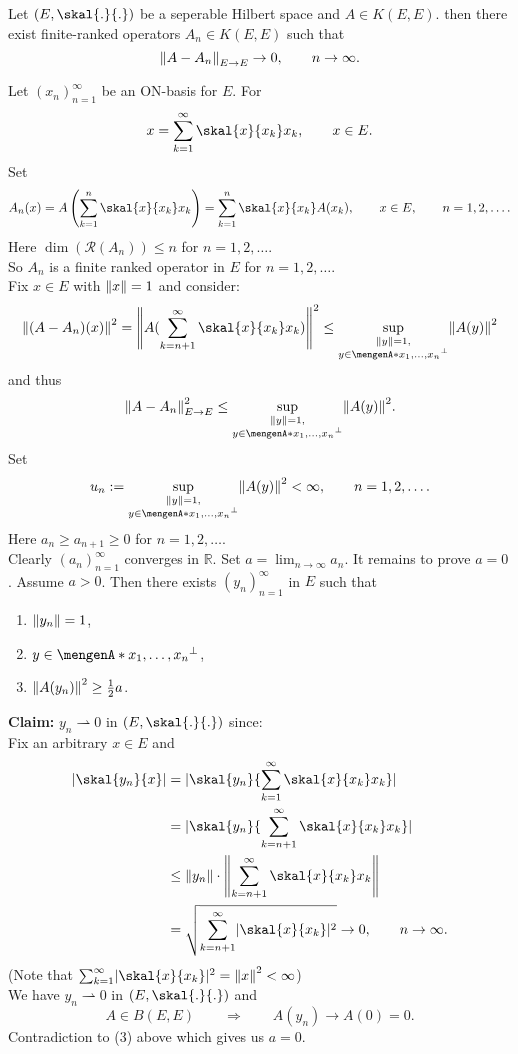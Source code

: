 \begin{proposition}
	Let $(E, \skal{.}{.})$ be a seperable Hilbert space and $A \in K(E,E)$. then there exist finite-ranked operators $A_n \in K(E,E)$ such that
	\[
		\norm{A-A_n}_{E \to E} \to 0, \qquad n \to \infty.
	\]
\end{proposition}
\begin{beweis}
	Let $(x_n)_{n=1}^{\infty}$ be an ON-basis for $E$. For 
	\[
		x = \sum_{k=1}^{\infty} \skal{x}{x_k}x_k, \qquad x \in E.
	\]
	Set 
	\[
		A_n(x) = A \left( \sum_{k=1}^{n}\skal{x}{x_k}x_k \right) = \sum_{k=1}^{n} \skal{x}{x_k}A(x_k), \qquad x \in E, \qquad n=1,2,\dots.
	\]
	Here $\dim( \mathcal{R}(A_n)) \leq n$ for $n =1,2,\dots$. \\
	So $A_n$ is a finite ranked operator in $E$ for $n=1,2,\dots$. \\
	Fix $x \in E$ with $\norm{x}=1$ and consider:
	\[
		\norm{(A-A_n)(x)}^2 = \norm{A(\sum_{k=n+1}^{\infty} \skal{x}{x_k}x_k)}^2 \leq \sup\limits_{\substack{\norm{y}=1, \\ y \in \set{x_1,\dots,x_n}^{\perp}}}
		\norm{A(y)}^2
	\]
	and thus
	\[
		\norm{A-A_n}_{E \to E}^2 \leq \sup\limits_{\substack{\norm{y}=1, \\ y \in \set{x_1,\dots,x_n}^{\perp}}} \norm{A(y)}^2.
	\]
	Set 
	\[
		u_n := \sup\limits_{\substack{\norm{y}=1, \\ y \in \set{x_1,\dots,x_n}^{\perp}}} \norm{A(y)}^2 < \infty, \qquad n =1,2,\dots.
	\]
	Here $a_n \geq a_{n+1} \geq 0$ for $n=1,2,\dots$. \\
	Clearly $(a_n)_{n=1}^{\infty}$ converges in $\mathbb{R}$. Set $a = \lim_{n \to \infty}a_n$. It remains to prove $a =0$.
	Assume $a>0$. Then there exists $(y_n)_{n=1}^{\infty}$ in $E$ such that
	\begin{enumerate}
		\item $\norm{y_n}=1$,
		\item $y \in \set{x_1,\dots,x_n}^{\perp}$,
		\item $\norm{A(y_n)}^2 \geq \frac{1}{2} a$.
	\end{enumerate}
	\textbf{Claim:} \text{    } $y_n \rightharpoonup 0$ in $(E,\skal{.}{.})$ since: \\
	Fix an arbitrary $x \in E$ and
	\begin{align*}
		\abs{\skal{y_n}{x}} &= \abs{\skal{y_n}{\sum_{k=1}^{\infty} \skal{x}{x_k}x_k}} \\
		&= \abs{\skal{y_n}{\sum_{k=n+1}^{\infty}\skal{x}{x_k}x_k}} \\
		&\leq \norm{y_n} \cdot \norm{\sum_{k=n+1}^{\infty}\skal{x}{x_k}x_k} \\
		&= \sqrt{\sum_{k=n+1}^{\infty}\abs{\skal{x}{x_k}}^2} \to 0, \qquad n \to \infty.
	\end{align*}
	(Note that $\sum_{k=1}^{\infty}\abs{\skal{x}{x_k}}^2 = \norm{x}^2 < \infty$) \\
	We have $y_n \rightharpoonup 0$ in $(E, \skal{.}{.})$ and
	\[
		A \in B(E,E) \qquad \Rightarrow \qquad A(y_n) \to A(0)= 0.
	\]
	Contradiction to (3) above which gives us $a=0$.
\end{beweis}

